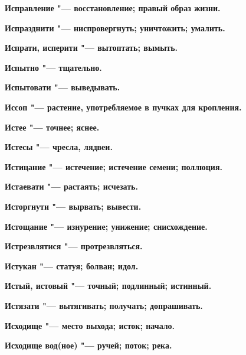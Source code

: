 \bfseries Исправление \normalfont{} "--- восстановление; правый образ жизни. 




\bfseries Испразднити \normalfont{} "--- ниспровергнуть; уничтожить; умалить. 




\bfseries Испрати, исперити \normalfont{} "--- вытоптать; вымыть. 




\bfseries Испытно \normalfont{} "--- тщательно. 




\bfseries Испытовати \normalfont{} "--- выведывать. 




\bfseries Иссоп \normalfont{} "--- растение, употребляемое в пучках для кропления. 




\bfseries Истее \normalfont{} "--- точнее; яснее. 




\bfseries Истесы \normalfont{} "--- чресла, лядвеи. 




\bfseries Истицание \normalfont{} "--- истечение; истечение семени; поллюция. 




\bfseries Истаевати \normalfont{} "--- растаять; исчезать. 




\bfseries Исторгнути \normalfont{} "--- вырвать; вывести. 




\bfseries Истощание \normalfont{} "--- изнурение; унижение; снисхождение. 




\bfseries Истрезвлятися \normalfont{} "--- протрезвляться. 




\bfseries Истукан \normalfont{} "--- статуя; болван; идол. 




\bfseries Истый, истовый \normalfont{} "--- точный; подлинный; истинный. 




\bfseries Истязати \normalfont{} "--- вытягивать; получать; допрашивать. 




\bfseries Исходище \normalfont{} "--- место выхода; исток; начало. 




\bfseries Исходище вод(ное) \normalfont{} "--- ручей; поток; река. 




